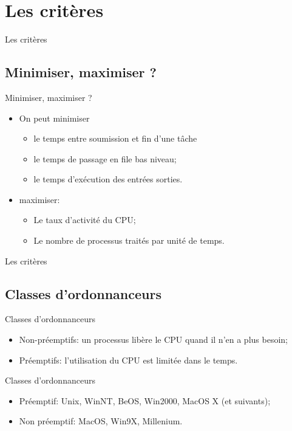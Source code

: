 \def\sectitle{Les critères}
\section{\sectitle}

\begin{frame}{\sectitle}

\def\subsectitle{Minimiser, maximiser ?}
\subsection{\subsectitle}
\begin{block}{\subsectitle}
\begin{itemize}
    \item On peut minimiser
    \begin{itemize}
        \item le temps entre soumission et fin d'une tâche
        \item le temps de passage en file bas niveau;
        \item le temps d'exécution des entrées sorties.
    \end{itemize}
    \item maximiser:
    \begin{itemize}
        \item Le taux d'activité du CPU;
        \item Le nombre de processus traités par unité de temps.
    \end{itemize}
\end{itemize}
\end{block}
\end{frame}

\begin{frame}{\sectitle}

\def\subsectitle{Classes d'ordonnanceurs}
\subsection{\subsectitle}

\begin{block}{\subsectitle}
\begin{itemize}
    \item Non-préemptifs: un processus libère le CPU quand il n'en a plus
    besoin;
    \item Préemptifs: l'utilisation du CPU est limitée dans le temps.
\end{itemize}
\end{block}

\begin{exampleblock}{\subsectitle}
\begin{itemize}
    \item Préemptif: Unix, WinNT, BeOS, Win2000, MacOS X (et suivants);
        \item Non préemptif: MacOS, Win9X, Millenium.
\end{itemize}
\end{exampleblock}

\end{frame}

